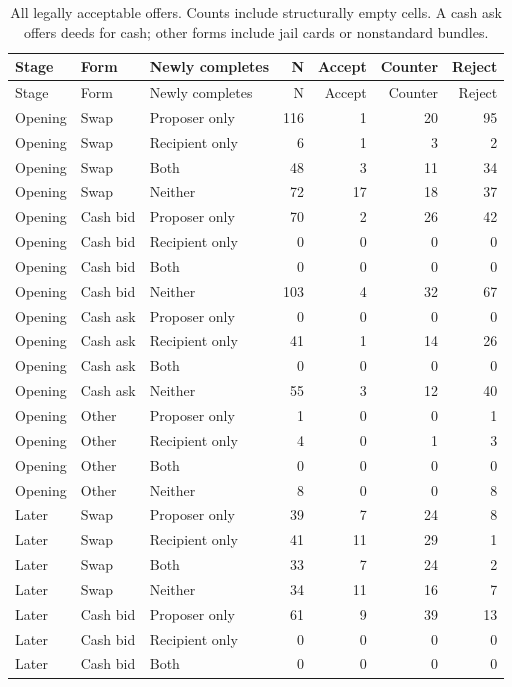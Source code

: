 \begin{longtable}{@{}lllrrrr@{}}
\caption{All legally acceptable offers. Counts include structurally empty cells. A cash ask offers deeds for cash; other forms include jail cards or nonstandard bundles.}\label{tab:full-offers}\\
\toprule Stage & Form & Newly completes & N & Accept & Counter & Reject\\\midrule\endfirsthead
\toprule Stage & Form & Newly completes & N & Accept & Counter & Reject\\\midrule\endhead
Opening & Swap & Proposer only & 116 & 1 & 20 & 95 \\
Opening & Swap & Recipient only & 6 & 1 & 3 & 2 \\
Opening & Swap & Both & 48 & 3 & 11 & 34 \\
Opening & Swap & Neither & 72 & 17 & 18 & 37 \\
Opening & Cash bid & Proposer only & 70 & 2 & 26 & 42 \\
Opening & Cash bid & Recipient only & 0 & 0 & 0 & 0 \\
Opening & Cash bid & Both & 0 & 0 & 0 & 0 \\
Opening & Cash bid & Neither & 103 & 4 & 32 & 67 \\
Opening & Cash ask & Proposer only & 0 & 0 & 0 & 0 \\
Opening & Cash ask & Recipient only & 41 & 1 & 14 & 26 \\
Opening & Cash ask & Both & 0 & 0 & 0 & 0 \\
Opening & Cash ask & Neither & 55 & 3 & 12 & 40 \\
Opening & Other & Proposer only & 1 & 0 & 0 & 1 \\
Opening & Other & Recipient only & 4 & 0 & 1 & 3 \\
Opening & Other & Both & 0 & 0 & 0 & 0 \\
Opening & Other & Neither & 8 & 0 & 0 & 8 \\
Later & Swap & Proposer only & 39 & 7 & 24 & 8 \\
Later & Swap & Recipient only & 41 & 11 & 29 & 1 \\
Later & Swap & Both & 33 & 7 & 24 & 2 \\
Later & Swap & Neither & 34 & 11 & 16 & 7 \\
Later & Cash bid & Proposer only & 61 & 9 & 39 & 13 \\
Later & Cash bid & Recipient only & 0 & 0 & 0 & 0 \\
Later & Cash bid & Both & 0 & 0 & 0 & 0 \\

\end{longtable}
